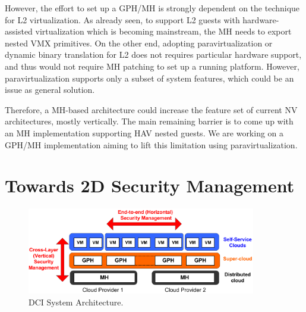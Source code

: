 \documentclass{sig-alternate}
\begin{document}
However, the effort to set up a GPH/MH is strongly dependent on the technique for L2 virtualization. As already seen, to support L2 guests with hardware-assisted virtualization which is becoming mainstream, the MH needs to export nested VMX primitives. On the other end, adopting paravirtualization or dynamic binary translation for L2 does not requires particular hardware support, and thus would not require MH patching to set up a running platform. However, paravirtualization supports only a subset of system features, which could be an issue as general solution.

Therefore, a MH-based architecture could increase the feature set of current NV architectures, mostly vertically. The main remaining barrier is to come up with an MH implementation supporting HAV nested guests. We are working on a GPH/MH implementation aiming to lift this limitation using paravirtualization.

\section{Towards 2D Security Management}
\label{sec:arch}

\begin{figure}[htbp]
\begin{center}
\includegraphics[width=10cm]{DCCArchitecture.png}
\vspace*{-0.5cm}
\end{center}
\caption{DCI System Architecture.}
\vspace*{-0.5cm}
\label{fig:archisecu}
\end{figure}
\end{document}
